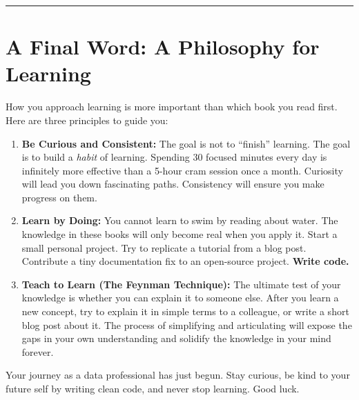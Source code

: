 \documentclass[
  letterpaper,
  DIV=11,
  numbers=noendperiod]{scrreprt}
\providecommand{\tightlist}{%
  \setlength{\itemsep}{0pt}\setlength{\parskip}{0pt}}
\begin{document}
\begin{center}\rule{0.5\linewidth}{0.5pt}\end{center}

\section{\texorpdfstring{\textbf{A Final Word: A Philosophy for
Learning}}{A Final Word: A Philosophy for Learning}}\label{a-final-word-a-philosophy-for-learning}

How you approach learning is more important than which book you read
first. Here are three principles to guide you:

\begin{enumerate}
\def\labelenumi{\arabic{enumi}.}
\tightlist
\item
  \textbf{Be Curious and Consistent:} The goal is not to ``finish''
  learning. The goal is to build a \emph{habit} of learning. Spending 30
  focused minutes every day is infinitely more effective than a 5-hour
  cram session once a month. Curiosity will lead you down fascinating
  paths. Consistency will ensure you make progress on them.
\item
  \textbf{Learn by Doing:} You cannot learn to swim by reading about
  water. The knowledge in these books will only become real when you
  apply it. Start a small personal project. Try to replicate a tutorial
  from a blog post. Contribute a tiny documentation fix to an
  open-source project. \textbf{Write code.}
\item
  \textbf{Teach to Learn (The Feynman Technique):} The ultimate test of
  your knowledge is whether you can explain it to someone else. After
  you learn a new concept, try to explain it in simple terms to a
  colleague, or write a short blog post about it. The process of
  simplifying and articulating will expose the gaps in your own
  understanding and solidify the knowledge in your mind forever.
\end{enumerate}

Your journey as a data professional has just begun. Stay curious, be
kind to your future self by writing clean code, and never stop learning.
Good luck.
\end{document}
